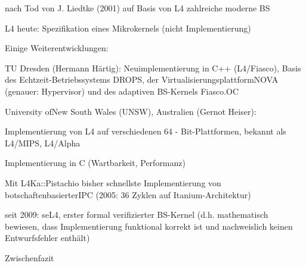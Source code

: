 \documentclass[a4paper]{article}
\begin{document}
\begin{multicols}{3}
    \begin{itemize*}
        \item
        nach Tod von J. Liedtke (2001) auf Basis von L4 zahlreiche moderne BS
        \item
        L4 heute: Spezifikation eines Mikrokernels (nicht Implementierung)
        \item
        \item
        Einige Weiterentwicklungen:
        \item
        TU Dresden (Hermann Härtig): Neuimplementierung in C++ (L4/Fiasco),
        Basis des Echtzeit-Betriebssystems DROPS, der
        VirtualisierungsplattformNOVA (genauer: Hypervisor) und des adaptiven
        BS-Kernels Fiasco.OC
        \item
        University ofNew South Wales (UNSW), Australien (Gernot Heiser):
        \begin{itemize*}
            \item Implementierung von L4 auf verschiedenen 64 - Bit-Plattformen, bekannt als L4/MIPS, L4/Alpha
            \item Implementierung in C (Wartbarkeit, Performanz)
            \item Mit L4Ka::Pistachio bisher schnellste Implementierung von botschaftenbasierterIPC (2005: 36 Zyklen auf Itanium-Architektur)
            \item seit 2009: seL4, erster formal verifizierter BS-Kernel (d.h. mathematisch bewiesen, dass Implementierung funktional korrekt ist und nachweislich keinen Entwurfsfehler enthält)
        \end{itemize*}
    \end{itemize*}

    Zwischenfazit


\end{multicols}
\end{document}
